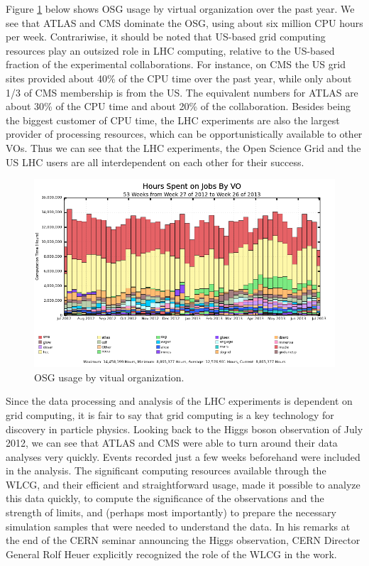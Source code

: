 Figure \ref{fig:OSG-usage} below shows OSG usage by virtual organization over the past year.  We see that ATLAS and CMS dominate the OSG, using about six million CPU hours per week.  Contrariwise, it should be noted that US-based grid computing resources play an outsized role in LHC computing, relative to the US-based fraction of the experimental collaborations.  For instance, on CMS the US grid sites provided about 40\% of the CPU time over the past year, while only about 1/3 of CMS membership is from the US.  The equivalent numbers for ATLAS are about 30\% of the CPU time and about 20\% of the collaboration. Besides being the biggest customer of CPU time, the LHC experiments are also the largest provider of processing resources, which can be opportunistically available to other VOs.  Thus we can see that the LHC experiments, the Open Science Grid and the US LHC users are all interdependent on each other for their success.

\begin{figure}[h]
\includegraphics[width=\textwidth]{CpF-I2/images/vo_hours_bar_smry_1.png}
\caption{OSG usage by vitual organization.}
\label{fig:OSG-usage}
\end{figure}

Since the data processing and analysis of the LHC experiments is dependent on grid computing, it is fair to say that grid computing is a key technology for discovery in particle physics.  Looking back to the Higgs boson observation of July 2012, we can see that ATLAS and CMS were able to turn around their data analyses very quickly.  Events recorded just a few weeks beforehand were included in the analysis.  The significant computing resources available through the WLCG, and their efficient and straightforward usage, made it possible to analyze this data quickly, to compute the significance of the observations and the strength of limits, and (perhaps most importantly) to prepare the necessary simulation samples that were needed to understand the data.  In his remarks at the end of the CERN seminar announcing the Higgs observation, CERN Director General Rolf Heuer explicitly recognized the role of the WLCG in the work.

